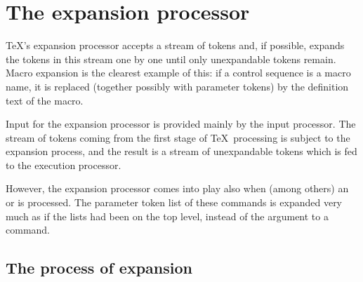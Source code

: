 \documentclass[letterpaper]{book}
\begin{document}
\section{The expansion processor}

\TeX's  expansion processor accepts a stream of tokens
and, if possible, 
expands the tokens in this stream one by one
until only unexpandable tokens remain.
Macro expansion is the clearest example of this:
if a control sequence is a macro name, it is replaced
(together possibly with parameter tokens) by 
the definition text of the macro.

Input for the expansion processor is provided mainly
by the input processor. The stream of tokens coming
from the first stage of \TeX\ processing is subject
to the expansion process, and the result is a stream
of unexpandable tokens which is fed to the execution processor.

However, the expansion processor comes into play 
also when (among others) an  or  is processed.
The parameter token list of these commands is
expanded very much as if the lists had been
on the top level, instead of the argument to a command.

\subsection{The process of expansion}
\end{document}
